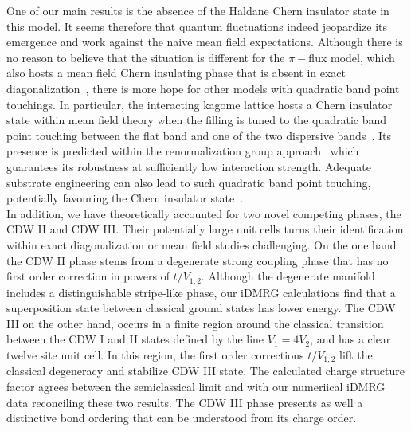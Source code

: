 \documentclass[aps,prx,10pt,twocolumn,floatfix,superscriptaddress,showpacs,numerical,footinbib]{revtex4-1}
\begin{document}
One of our main results is the absence of the Haldane Chern insulator state in this model.
%
It seems therefore that quantum fluctuations indeed jeopardize its emergence and work against
the naive mean field expectations.
%
Although there is no reason to believe that the situation is different for the $\pi-$flux model, which also hosts a
mean field Chern insulating phase that is absent in exact diagonalization~\cite{WF10,JGC13}, 
there is more hope for other models with quadratic band point touchings.
%
In particular, the interacting kagome lattice hosts a Chern insulator state within mean field theory when the filling is tuned to
the quadratic band point touching between the flat band and one of the two dispersive bands~\cite{WRW10}.
%
Its presence is predicted within the renormalization group approach~\cite{SF08,SYF09} which guarantees
its robustness at sufficiently low interaction strength.
%
Adequate substrate engineering can also lead to such quadratic band point touching, potentially favouring the Chern insulator state~\cite{MVB14}.
\\
%
In addition, we have theoretically accounted for two novel competing phases, the CDW II and CDW III.
%
Their potentially large unit cells turns their identification within exact diagonalization or mean field studies 
challenging.
%
On the one hand the CDW II phase stems from a degenerate strong coupling phase that has no first order correction in powers of $t/V_{1,2}$.
%
Although the degenerate manifold includes a distinguishable stripe-like phase, our iDMRG calculations find that a superposition state 
between classical ground states has lower energy.
%
The CDW III on the other hand, occurs in a finite region around the classical transition between
the CDW I and II states defined by the line $V_{1}=4V_{2}$, and has a clear twelve site unit cell.
%
In this region, the first order corrections $t/V_{1,2}$ lift the classical degeneracy and stabilize CDW III state.
%
The calculated charge structure factor agrees between the semiclassical limit and with our numeriical iDMRG data 
reconciling these two results.
%
The CDW III phase presents as well a distinctive bond ordering that can be understood from its charge order.
\end{document}
